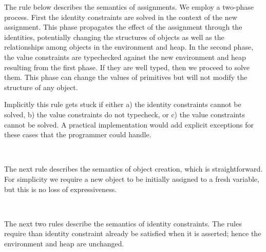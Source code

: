 The rule below describes the semantics of assignments.  We
employ a two-phase process.  First the identity constraints are solved
in the context of the new assignment.  This phase propagates the
effect of the assignment through the identities, potentially changing
the structures of objects as well as the relationships among objects
 in the environment and heap.  
In the second phase, the value constraints
are typechecked against the new environment and heap resulting from
the first phase.  If they are well typed, then we proceed to solve
them.  This phase can change the values of primitives but will not
modify the structure of any object.

Implicitly this rule gets stuck if either a) the identity constraints
cannot be solved, b) the value constraints do not typecheck, 
or c) the value constraints cannot be solved. A
practical implementation would add explicit exceptions for these cases
that the programmer could handle.

{\mbox{
}}

The next rule describes the semantics of object creation, which is
straightforward.  For simplicity we require a new object to be
initially assigned to a fresh variable, but this is no loss of expressiveness.

{\mbox{
}}

The next two rules describe the semantics of identity constraints.  
The rules require than 
identity constraint already be satisfied when it is asserted; hence
the environment and heap are unchanged.

